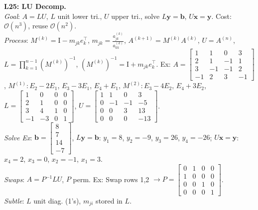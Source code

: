 \documentclass[9pt]{article}
\begin{document}
\begin{multicols}{3}
\textbf{L25: LU Decomp.} \\
\textit{Goal}: $A=LU$, $L$ unit lower tri., $U$ upper tri., solve $L\mathbf{y}=\mathbf{b}$, $U\mathbf{x}=\mathbf{y}$. Cost: $\mathcal{O}(n^3)$, reuse $\mathcal{O}(n^2)$. \\
\textit{Process}: $M^{(k)}=\text{I}-m_{jk}e_k^\top$, $m_{jk}=\frac{a_{jk}^{(k)}}{a_{kk}^{(k)}}$, $A^{(k+1)}=M^{(k)}A^{(k)}$, $U=A^{(n)}$, $L=\prod_{k=1}^{n-1} (M^{(k)})^{-1}$, $(M^{(k)})^{-1}=\text{I}+m_{jk}e_k^\top$. Ex: $A=\begin{bmatrix}1&1&0&3\\2&1&-1&1\\3&-1&-1&2\\-1&2&3&-1\end{bmatrix}$, $M^{(1)}: E_2-2E_1$, $E_3-3E_1$, $E_4+E_1$, $M^{(2)}: E_3-4E_2$, $E_4+3E_2$, $L=\begin{bmatrix}1&0&0&0\\2&1&0&0\\3&4&1&0\\-1&-3&0&1\end{bmatrix}$, $U=\begin{bmatrix}1&1&0&3\\0&-1&-1&-5\\0&0&3&13\\0&0&0&-13\end{bmatrix}$. \\
\textit{Solve Ex}: $\mathbf{b}=\begin{bmatrix}8\\7\\14\\-7\end{bmatrix}$, $L\mathbf{y}=\mathbf{b}$: $y_1=8$, $y_2=-9$, $y_3=26$, $y_4=-26$; $U\mathbf{x}=\mathbf{y}$: $x_4=2$, $x_3=0$, $x_2=-1$, $x_1=3$. \\
\textit{Swaps}: $A=P^{-1}LU$, $P$ perm. Ex: Swap rows 1,2 $\to P=\begin{bmatrix}0&1&0&0\\1&0&0&0\\0&0&1&0\\0&0&0&1\end{bmatrix}$. \\
\textit{Subtle}: $L$ unit diag. (1’s), $m_{ji}$ stored in $L$.


\end{multicols}
\end{document}
